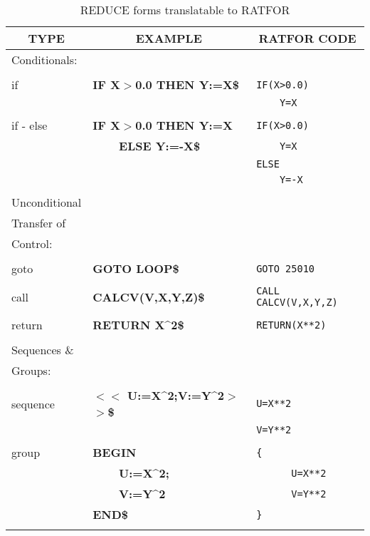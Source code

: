 \begin{table}
\begin{tabular}{||l|l|l||}\hline\hline
\multicolumn{1}{||c|}{\bf TYPE} & \multicolumn{1}{c|}{\bf EXAMPLE}
 & \multicolumn{1}{c||}{\bf RATFOR CODE} \\ \hline\hline
  Conditionals:&     &\\
&     &\\
    if  &{\bf IF X$>$0.0 THEN Y:=X\$} &\verb!IF(X>0.0)!\\
&     &\verb!    Y=X!\\
&     &\\
    if - else  &{\bf IF X$>$0.0 THEN Y:=X} &\verb!IF(X>0.0)!\\
&{\bf\ \ \ \  ELSE Y:=-X\$}&\verb!    Y=X!\\
&     &\verb!ELSE!\\
&     &\verb!    Y=-X!\\
& & \\\hline
  Unconditional&     &\\
  Transfer of  &     &\\
  Control:     &     &\\
&     &\\
    goto&{\bf GOTO LOOP\$} &\verb!GOTO 25010!\\
&     &\\
    call&{\bf CALCV(V,X,Y,Z)\$} &\verb!CALL CALCV(V,X,Y,Z)!\\
&     &\\
    return     &{\bf RETURN X\^{}2\$} &\verb!RETURN(X**2)!\\
& & \\\hline
Sequences \&    &     &\\
Groups: &     &\\
&     &\\
    sequence   &{\bf $<$$<$ U:=X\^{}2;V:=Y\^{}2$>$$>$\$}&\verb!U=X**2!\\
&     &\verb!V=Y**2!\\
&     &\\
    group      &{\bf BEGIN}&\verb!{!\\
&{\bf\ \ \ \  U:=X\^{}2;}& \verb!      U=X**2!\\
&{\bf\ \ \ \  V:=Y\^{}2} & \verb!      V=Y**2!\\
&{\bf END\$}&\verb!}!\\
& & \\\hline\hline
\end{tabular}
\caption{REDUCE forms translatable to RATFOR}
\end{table}

